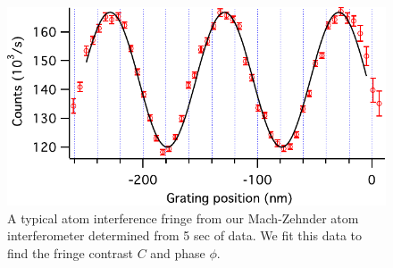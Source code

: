 \begin{figure}
\centerline{\includegraphics[width=.75\textwidth]{Figures/atomFringe.pdf}}
\caption[Atom interference fringe.]{\label{atomFringe}A typical atom interference fringe from our Mach-Zehnder atom interferometer determined from 5 sec of data. We fit this data to find the fringe contrast $C$ and phase $\phi$.}
\end{figure}


